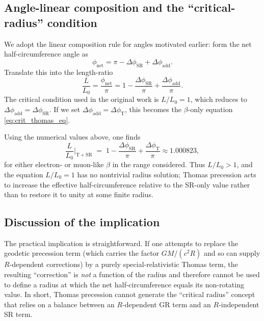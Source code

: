 \documentclass[%
 reprint,
 amsmath,amssymb,
 aps,
]{revtex4-1}
\numberwithin{equation}{section}%
\begin{document}
\subsection{Angle-linear composition and the ``critical-radius'' condition}

We adopt the linear composition rule for angles motivated earlier: form the net half-circumference angle as
\begin{equation}
\phi_{\mathrm{net}}=\pi - \Delta\phi_{\mathrm{SR}} + \Delta\phi_{\mathrm{add}}.
\label{eq:phi_net}
\end{equation}
Translate this into the length-ratio
\begin{equation}
\frac{L}{L_0}=\frac{\phi_{\mathrm{net}}}{\pi}=1-\frac{\Delta\phi_{\mathrm{SR}}}{\pi}+\frac{\Delta\phi_{\mathrm{add}}}{\pi}.
\label{eq:L_over_L0}
\end{equation}
The critical condition used in the original work is $L/L_0=1$, which reduces to $\Delta\phi_{\mathrm{add}}=\Delta\phi_{\mathrm{SR}}$. If we set $\Delta\phi_{\mathrm{add}}=\Delta\phi_{\mathrm{T}}$, this becomes the $\beta$-only equation \eqref{eq:crit_thomas_eq}.

Using the numerical values above, one finds
\begin{equation}
\frac{L}{L_0}\Big|_{\mathrm{T+SR}} \;=\; 1 - \frac{\Delta\phi_{\mathrm{SR}}}{\pi} + \frac{\Delta\phi_{\mathrm{T}}}{\pi}
\approx 1.000823,
\label{eq:L_over_L0_num}
\end{equation}
for either electron- or muon-like $\beta$ in the range considered. Thus $L/L_0>1$, and the equation $L/L_0=1$ has no nontrivial radius solution; Thomas precession acts to increase the effective half-circumference relative to the SR-only value rather than to restore it to unity at some finite radius.

\subsection{Discussion of the implication}

The practical implication is straightforward. If one attempts to replace the geodetic precession term (which carries the factor $GM/(c^{2}R)$ and so can supply $R$-dependent corrections) by a purely special-relativistic Thomas term, the resulting ``correction'' is \emph{not} a function of the radius and therefore cannot be used to define a radius at which the net half-circumference equals its non-rotating value. In short, Thomas precession cannot generate the ``critical radius'' concept that relies on a balance between an $R$-dependent GR term and an $R$-independent SR term.
\end{document}
